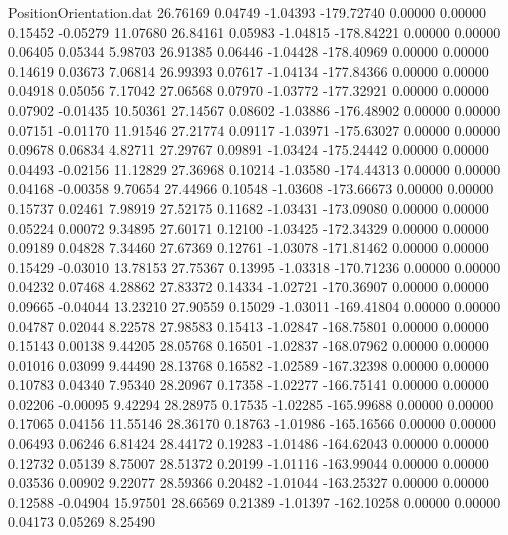 \begin{filecontents}{PositionOrientation.dat}
  26.76169    0.04749   -1.04393  -179.72740    0.00000    0.00000    0.15452   -0.05279   11.07680
  26.84161    0.05983   -1.04815  -178.84221    0.00000    0.00000    0.06405    0.05344    5.98703
  26.91385    0.06446   -1.04428  -178.40969    0.00000    0.00000    0.14619    0.03673    7.06814
  26.99393    0.07617   -1.04134  -177.84366    0.00000    0.00000    0.04918    0.05056    7.17042
  27.06568    0.07970   -1.03772  -177.32921    0.00000    0.00000    0.07902   -0.01435   10.50361
  27.14567    0.08602   -1.03886  -176.48902    0.00000    0.00000    0.07151   -0.01170   11.91546
  27.21774    0.09117   -1.03971  -175.63027    0.00000    0.00000    0.09678    0.06834    4.82711
  27.29767    0.09891   -1.03424  -175.24442    0.00000    0.00000    0.04493   -0.02156   11.12829
  27.36968    0.10214   -1.03580  -174.44313    0.00000    0.00000    0.04168   -0.00358    9.70654
  27.44966    0.10548   -1.03608  -173.66673    0.00000    0.00000    0.15737    0.02461    7.98919
  27.52175    0.11682   -1.03431  -173.09080    0.00000    0.00000    0.05224    0.00072    9.34895
  27.60171    0.12100   -1.03425  -172.34329    0.00000    0.00000    0.09189    0.04828    7.34460
  27.67369    0.12761   -1.03078  -171.81462    0.00000    0.00000    0.15429   -0.03010   13.78153
  27.75367    0.13995   -1.03318  -170.71236    0.00000    0.00000    0.04232    0.07468    4.28862
  27.83372    0.14334   -1.02721  -170.36907    0.00000    0.00000    0.09665   -0.04044   13.23210
  27.90559    0.15029   -1.03011  -169.41804    0.00000    0.00000    0.04787    0.02044    8.22578
  27.98583    0.15413   -1.02847  -168.75801    0.00000    0.00000    0.15143    0.00138    9.44205
  28.05768    0.16501   -1.02837  -168.07962    0.00000    0.00000    0.01016    0.03099    9.44490
  28.13768    0.16582   -1.02589  -167.32398    0.00000    0.00000    0.10783    0.04340    7.95340
  28.20967    0.17358   -1.02277  -166.75141    0.00000    0.00000    0.02206   -0.00095    9.42294
  28.28975    0.17535   -1.02285  -165.99688    0.00000    0.00000    0.17065    0.04156   11.55146
  28.36170    0.18763   -1.01986  -165.16566    0.00000    0.00000    0.06493    0.06246    6.81424
  28.44172    0.19283   -1.01486  -164.62043    0.00000    0.00000    0.12732    0.05139    8.75007
  28.51372    0.20199   -1.01116  -163.99044    0.00000    0.00000    0.03536    0.00902    9.22077
  28.59366    0.20482   -1.01044  -163.25327    0.00000    0.00000    0.12588   -0.04904   15.97501
  28.66569    0.21389   -1.01397  -162.10258    0.00000    0.00000    0.04173    0.05269    8.25490

\end{filecontents}

